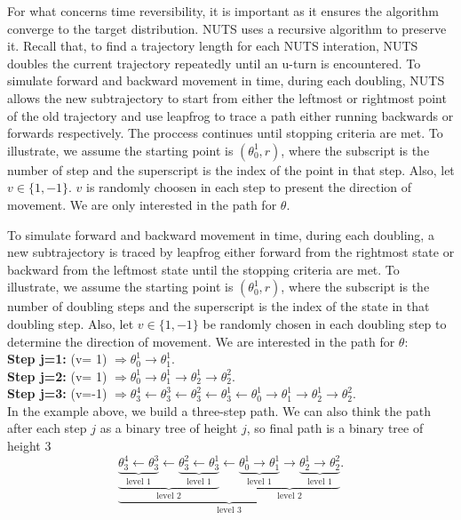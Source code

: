 \documentclass{article}
\begin{document}
\par For what concerns time reversibility, it is important as it ensures the algorithm converge to the target distribution. NUTS uses a recursive algorithm to preserve it. Recall that, to find a trajectory length for each NUTS interation, NUTS doubles the current trajectory repeatedly until an u-turn is encountered. To simulate forward and backward movement in time, during each doubling, NUTS allows the new subtrajectory to start from either the leftmost or rightmost point of the old trajectory and use leapfrog to trace a path either running backwards or forwards respectively. The proccess continues until stopping criteria are met. To illustrate, we assume the starting point is $(\theta_0^1,r)$, where the subscript is the number of step and the superscript is the index of the point in that step. Also, let $v\in\{1,-1\}$. $v$ is randomly choosen in each step to present the direction of movement. We are only interested in the path for $\theta$.

To simulate forward and backward movement in time, during each doubling, a new subtrajectory is traced by leapfrog either forward from the rightmost state or backward from the leftmost state until the stopping criteria are met. To illustrate, we assume the starting point is $(\theta_0^1,r)$, where the subscript is the number of doubling steps and the superscript is the index of the state in that doubling step. Also, let $v\in\{1,-1\}$ be randomly chosen in each doubling step to determine the direction of movement. We are interested in the path for $\theta$:\\
\textbf{Step j=1:}   (v= 1)  $ \Rightarrow \theta_0^1 \rightarrow \theta_1^1.$ \\
\textbf{Step j=2:}   (v= 1)  $ \Rightarrow \theta_0^1 \rightarrow \theta_1^1 \rightarrow \theta_2^1 \rightarrow \theta_2^2.$ \\
\textbf{Step j=3:}   (v=-1)  $ \Rightarrow \theta_3^4\leftarrow\theta_3^3\leftarrow\theta_3^2\leftarrow \theta_3^1\leftarrow\theta_0^1 \rightarrow \theta_1^1 \rightarrow \theta_2^1 \rightarrow \theta_2^2.$ \\
\noindent In the example above, we build a three-step path. We can also think the path after each step $j$ as a binary tree of height $j$, so final path is a binary tree of height 3
$$\underbrace{\underbrace{\underbrace{\theta_3^4\leftarrow\theta_3^3}_{\text{level }1}\leftarrow\underbrace{\theta_3^2\leftarrow \theta_3^1}_{\text{level }1}}_{\text{level }2}\leftarrow\underbrace{\underbrace{\theta_0^1 \rightarrow \theta_1^1}_{\text{level }1} \rightarrow \underbrace{\theta_2^1 \rightarrow \theta_2^2}_{\text{level }1}}_{\text{level }2}}_{\text{level }3}.$$
\end{document}
